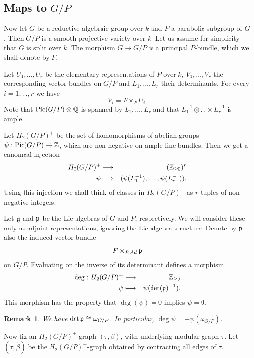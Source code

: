 \documentclass{article}
\newtheorem{rmkp}{Remark}\renewcommand{\thermkp}{}
\newenvironment{rmk}{\begin{rmkp}\rm}{\end{rmkp}}
\renewcommand{\tilde}{\widetilde}
\newcommand{\Gg}{{\frak g}}
\newcommand{\Pp}{{\frak p}}
\newcommand{\zz}{{\Bbb Z}}
\newcommand{\qq}{{\Bbb Q}}
\newcommand{\Pic}{\mathop{\rm Pic}\nolimits}
\begin{document}
\subsection{Maps to $G/P$}

Now let $G$ be a reductive algebraic group over $k$ and $P$ a
parabolic subgroup of $G$. Then $G/P$ is a smooth projective variety
over $k$. Let us assume for simplicity that $G$ is split over $k$. The
morphism $G\rightarrow G/P$ is a principal $P$-bundle, which we shall
denote by $F$.

Let $U_1,\ldots,U_r$ be the elementary representations of $P$ over
$k$, $V_1,\ldots,V_r$ the corresponding vector bundles on $G/P$ and
$L_1,\ldots,L_r$ their determinants. For every $i=1,\ldots,r$ we have
\[V_i=F\times_PU_i.\]
Note that $\Pic(G/P)\otimes\qq$ is spanned by $L_1,\ldots,L_r$ and
that $L_1^{-1}\otimes\ldots\times L_r^{-1}$ is ample.

Let $H_2(G/P)^+$ be the set of homomorphisms of abelian groups
$\psi:\Pic(G/P)\rightarrow\zz$, which are non-negative on ample line
bundles. Then we get a canonical injection
\begin{eqnarray*}
H_2(G/P)^+ & \longrightarrow & (\zz_{\geq0})^r\\
\psi       & \longmapsto     & (\psi(L_1^{-1}),\ldots,\psi(L_r^{-1})).
\end{eqnarray*}
Using this injection we shall think of classes in $H_2(G/P)^+$ as
$r$-tuples of non-negative integers.

Let $\Gg$ and $\Pp$ be the Lie algebras of $G$ and $P$,
respectively. We will consider these only as adjoint representations,
ignoring the Lie algebra structure. Denote by $\Pp$ also the induced
vector bundle
\[F\times_{P,Ad}\Pp\]
on $G/P$. Evaluating on the inverse of its determinant defines a
morphism
\begin{eqnarray*}
\deg:H_2(G/P)^+ & \longrightarrow & \zz_{\geq0} \\
\psi            & \longmapsto     & \psi(\det(\Pp)^{-1}).
\end{eqnarray*}
This morphism has the property that $\deg(\psi)=0$ implies $\psi=0$.

\begin{rmk}
We have $\det\Pp\cong\omega_{G/P}$. In particular,
$\deg\psi=-\psi(\omega_{G/P})$.
\end{rmk}

Now fix an $H_2(G/P)^+$-graph $(\tau,\beta)$, with underlying modular
graph $\tau$. Let $(\tilde{\tau},\tilde{\beta})$ be the $H_2(G/P)^+$-graph
obtained by contracting all edges of $\tau$.
\end{document}
